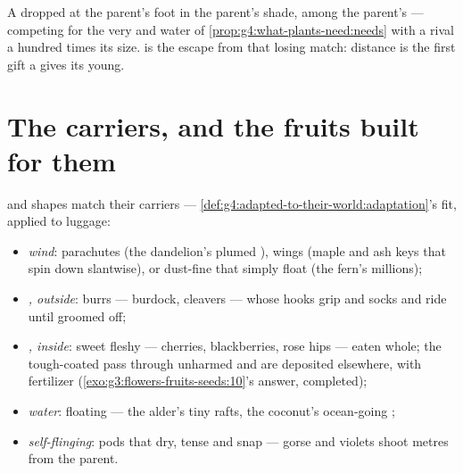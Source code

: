 \begin{example}\label{ex:g6:how-plants-spread:whyleave}
A  dropped at the parent's foot  in the
parent's shade, among the parent's  --- competing for
the very  and water of
\cref{prop:g4:what-plants-need:needs} with a rival a
hundred times its size.  is the escape from that
losing match: distance is the first gift a  gives its
young.
\end{example}

\section{The carriers, and the fruits built for them}

\begin{proposition}\label{prop:g6:how-plants-spread:builds}
 and  shapes match their carriers ---
\cref{def:g4:adapted-to-their-world:adaptation}'s fit,
applied to luggage:
\begin{itemize}
  \item \emph{wind}: parachutes (the dandelion's plumed
        ), wings (maple and ash keys that spin down
        slantwise), or dust-fine  that simply float
        (the fern's millions);
  \item \emph{, outside}: burrs --- burdock,
        cleavers --- whose hooks grip  and socks and ride
        until groomed off;
  \item \emph{, inside}: sweet fleshy  ---
        cherries, blackberries, rose hips --- eaten whole;
        the tough-coated  pass through unharmed and are
        deposited elsewhere, with fertilizer
        (\cref{exo:g3:flowers-fruits-seeds:10}'s answer,
        completed);
  \item \emph{water}: floating  --- the alder's tiny
        rafts, the coconut's ocean-going ;
  \item \emph{self-flinging}: pods that dry, tense and snap
        --- gorse and violets shoot  metres from the
        parent.
\end{itemize}
\end{proposition}
\admitted

